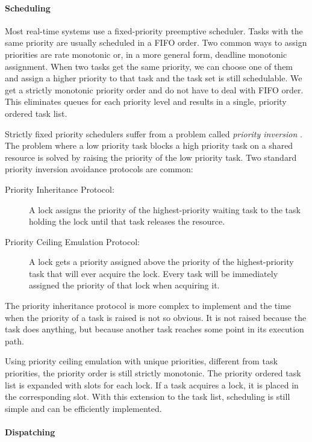 \paragraph{Scheduling}

Most real-time systems use a fixed-priority preemptive scheduler.
Tasks with the same priority are usually scheduled in a FIFO order.
Two common ways to assign priorities are rate monotonic or, in a
more general form, deadline monotonic assignment. When two tasks get
the same priority, we can choose one of them and assign a higher
priority to that task and the task set is still schedulable. We get
a strictly monotonic priority order and do not have to deal with
FIFO order. This eliminates queues for each priority level and
results in a single, priority ordered task list.

Strictly fixed priority schedulers suffer from a problem called
\emph{priority inversion} \cite{626613}. The problem where a low
priority task blocks a high priority task on a shared resource is
solved by raising the priority of the low priority task. Two
standard priority inversion avoidance protocols are common:
%
\begin{description}
    \item[Priority Inheritance Protocol:] A lock assigns the priority
of the highest-priority waiting task to the task holding the lock
until that task releases the resource.

    \item[Priority Ceiling Emulation Protocol:] A lock gets a priority
assigned above the priority of the highest-priority task that will
ever acquire the lock. Every task will be immediately assigned the
priority of that lock when acquiring it.
\end{description}
%
The priority inheritance protocol is more complex to implement and
the time when the priority of a task is raised is not so obvious. It
is not raised because the task does anything, but because another
task reaches some point in its execution path.

Using priority ceiling emulation with unique priorities, different
from task priorities, the priority order is still strictly
monotonic. The priority ordered task list is expanded with slots for
each lock. If a task acquires a lock, it is placed in the
corresponding slot. With this extension to the task list, scheduling
is still simple and can be efficiently implemented.

\paragraph{Dispatching}


